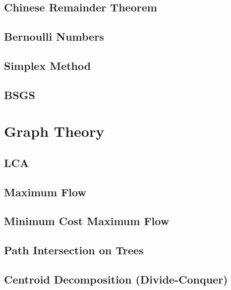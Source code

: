 \subsection{Chinese Remainder Theorem}
\raggedbottom
\hrulefill
\subsection{Bernoulli Numbers}
\raggedbottom
\hrulefill
\subsection{Simplex Method}
\raggedbottom
\hrulefill
\subsection{BSGS}
\raggedbottom
\hrulefill

\section{Graph Theory}
\subsection{LCA}
\raggedbottom
\hrulefill
\subsection{Maximum Flow}
\raggedbottom
\hrulefill
\subsection{Minimum Cost Maximum Flow}
\raggedbottom
\hrulefill
\subsection{Path Intersection on Trees}
\raggedbottom
\hrulefill
\subsection{Centroid Decomposition (Divide-Conquer)}
\raggedbottom
\hrulefill
